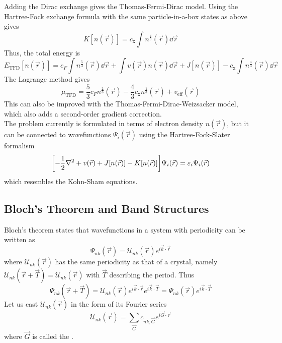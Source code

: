 \documentclass[12pt,a4paper,titlepage]{article}
\newcommand{\trm}[1]{\textrm{#1}} %
\newcommand{\ul}[1]{\underline{\smash{#1}}} %
\begin{document}
Adding the Dirac exchange gives the Thomas-Fermi-Dirac model. Using the Hartree-Fock exchange formula with the same particle-in-a-box states as above gives
\begin{equation}
K[n(\vec{r})]=c_{\trm{x}}\int n^{\frac{4}{3}}(\vec{r})\dd{\vec{r}}
\end{equation}
Thus, the total energy is
\begin{equation}
E_{\trm{TFD}}[n(\vec{r})]=c_{F}\int n^{\frac{5}{3}}(\vec{r})\dd{\vec{r}}+\int v(\vec{r})n(\vec{r})\dd{\vec{r}}+J[n(\vec{r})]-c_{\trm{x}}\int n^{\frac{4}{3}}(\vec{r})\dd{\vec{r}}
\end{equation}
The Lagrange method gives
\begin{equation}
\mu_{\trm{TFD}}=\frac{5}{3}c_{F}n^{\frac{2}{3}}(\vec{r})-\frac{4}{3}c_{\trm{x}}n^{\frac{1}{3}}(\vec{r})+v_{\trm{eff}}(\vec{r})
\end{equation}
This can also be improved with the Thomas-Fermi-Dirac-Weizsacker model, which also adds a second-order gradient correction.\\

The problem currently is formulated in terms of electron density $n(\vec{r})$, but it can be connected to wavefunctions $\Psi_{i}(\vec{r})$ using the Hartree-Fock-Slater formalism
\begin{equation}
\qty[-\frac{1}{2}\nabla^{2}+v(\vec{r})+J[n(\vec{r})]-K[n(\vec{r})]]\Psi_{i}(\vec{r})=\varepsilon_{i}\Psi_{i}(\vec{r})
\end{equation}
which resembles the Kohn-Sham equations.

\subsection{Bloch's Theorem and Band Structures}
Bloch's theorem states that wavefunctions in a system with periodicity can be written as
\begin{equation}
\Psi_{nk}(\vec{r})=\mathcal{U}_{nk}(\vec{r})e^{i\vec{k}\cdot\vec{r}}
\end{equation}
where $\mathcal{U}_{nk}(\vec{r})$ has the same periodicity as that of a crystal, namely $\mathcal{U}_{nk}(\vec{r}+\vec{T})=\mathcal{U}_{nk}(\vec{r})$ with $\vec{T}$ describing the period. Thus
\begin{equation}
\Psi_{nk}(\vec{r}+\vec{T})=\mathcal{U}_{nk}(\vec{r})e^{i\vec{k}\cdot\vec{r}}e^{i\vec{k}\cdot\vec{T}}=\Psi_{nk}(\vec{r})e^{i\vec{k}\cdot\vec{T}}
\end{equation}
Let us cast $\mathcal{U}_{nk}(\vec{r})$ in the form of its Fourier series
\begin{equation}
\mathcal{U}_{nk}(\vec{r})=\sum_{\vec{G}}c_{nk,\vec{G}}e^{i\vec{G}\cdot\vec{r}}
\end{equation}
where $\vec{G}$ is called the \ul{reciprocal lattice vector}.\\
\end{document}
